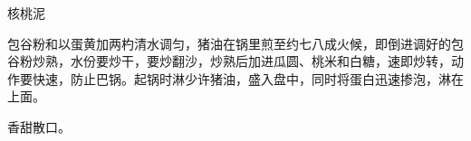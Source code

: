 \begin{recipe}{核桃泥}

\ingredients




\cooking

包谷粉和以蛋黄加两杓清水调匀，猪油在锅里煎至约七八成火候，即倒进调好的包谷粉炒熟，水份要炒干，要炒翻沙，炒熟后加进瓜圆、桃米和白糖，速即炒转，动作要快速，防止巴锅。起锅时淋少许猪油，盛入盘中，同时将蛋白迅速掺泡，淋在上面。

\notes

香甜散口。

\end{recipe}

